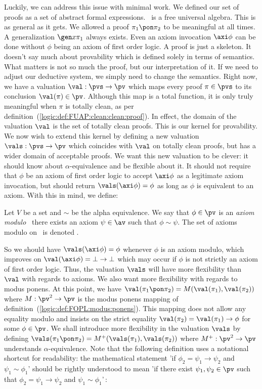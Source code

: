 Luckily, we can address this issue with minimal work. We defined our
set of proofs as a set of abstract formal expressions. \pvs\ is a
free universal algebra. This is as general as it gets. We allowed a
proof $\pi_{1}\pon\pi_{2}$ to be meaningful at all times. A
generalization $\gen x\pi_{1}$ always exists. Even an axiom
invocation $\axi\phi$ can be done without $\phi$ being an axiom of
first order logic. A proof is just a skeleton. It doesn't say much
about provability which is defined solely in terms of semantics.
What matters is not so much the proof, but our interpretation of it.
If we need to adjust our deductive system, we simply need to change
the semantics. Right now, we have a valuation $\val:\pvs\to\pv$
which maps every proof $\pi\in\pvs$ to its conclusion
$\val(\pi)\in\pv$. Although this map is a total function, it is only
truly meaningful when $\pi$ is totally clean, as per
definition~(\ref{logic:def:FUAP:clean:clean:proof}). In effect, the
domain of the valuation $\val$ is the set of totally clean proofs.
This is our kernel for provability. We now wish to extend this
kernel by defining a new valuation $\vals:\pvs\to\pv$ which
coincides with $\val$ on totally clean proofs, but has a wider
domain of acceptable proofs. We want this new valuation to be
clever: it should know about $\alpha$-equivalence and be flexible
about it. It should not require that $\phi$ be an axiom of first
order logic to accept $\axi\phi$ as a legitimate axiom invocation,
but should return $\vals(\axi\phi)=\phi$ as long as $\phi$ is
equivalent to an axiom. With this in mind, we define:

\begin{defin}\label{logic:def:FUAP:valuationmod:axiom:modulo}
Let $V$ be a set and $\sim$ be the alpha equivalence. We say
that $\phi\in\pv$ is an {\em axiom modulo} \ifand\ there exists an
axiom $\psi\in\av$ such that $\phi\sim\psi$. The set of axioms
modulo on \pv\ is denoted \avs.
\end{defin}

So we should have $\vals(\axi\phi)=\phi$ whenever $\phi$ is an axiom
modulo, which improves on $\val(\axi\phi)=\bot\to\bot$ which may
occur if $\phi$ is not strictly an axiom of first order logic. Thus,
the valuation $\vals$ will have more flexibility than $\val$ with
regards to axioms. We also want more flexibility with regards to
modus ponens. At this point, we have
$\val(\pi_{1}\pon\pi_{2})=M(\val(\pi_{1}),\val(\pi_{2}))$ where
$M:\pv^{2}\to\pv$ is the modus ponens mapping of
definition~(\ref{logic:def:FOPL:modus:ponens}). This mapping does
not allow any equality modulo and insists on the strict equality
$\val(\pi_{2})=\val(\pi_{1})\to\phi$ for some $\phi\in\pv$. We shall
introduce more flexibility in the valuation $\vals$ by defining
$\vals(\pi_{1}\pon\pi_{2})=M^{+}(\vals(\pi_{1}),\vals(\pi_{2}))$
where $M^{+}:\pv^{2}\to\pv$ understands $\alpha$-equivalence. Note
that the following definition uses a notational shortcut for
readability: the mathematical statement 'if
$\phi_{2}=\psi_{1}\to\psi_{2}$ and $\psi_{1}\sim\phi_{1}$' should be
rightly understood to mean 'if there exist $\psi_{1},\psi_{2}\in\pv$
such that $\phi_{2}=\psi_{1}\to\psi_{2}$ and
$\psi_{1}\sim\phi_{1}$'\,:

